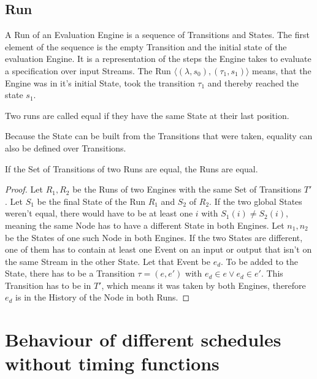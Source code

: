 \subsection{Run}
\label{sec:concepts:def:run}

A Run of an Evaluation Engine is a sequence of Transitions and States.
The first element of the sequence is the empty Transition and the initial state of the evaluation Engine.
It is a representation of the steps the Engine takes to evaluate a specification over input Streams.
The Run \(\langle (\lambda, s_0), (\tau_1, s_1) \rangle\) means, that the Engine was in it's initial State, took the transition \(\tau_1\) and thereby reached the state \(s_1\).

\begin{definition}
  Two runs are called equal if they have the same State at their last position.
\label{def:equal_runs}
\end{definition}

Because the State can be built from the Transitions that were taken, equality can also be defined over Transitions.

\begin{lemma}
If the Set of Transitions of two Runs are equal, the Runs are equal.
\label{lemma:equal_runs_with_transitions}
\end{lemma}
\begin{proof}
  Let \(R_1, R_2\) be the Runs of two Engines with the same Set of Transitions \(T'\).
  Let \(S_1\) be the final State of the Run \(R_1\) and \(S_2\) of \(R_2\).
  If the two global States weren't equal, there would have to be at least one \(i\) with \(S_1(i) \neq S_2(i)\), meaning the same Node has to have a different State in both Engines.
  Let \(n_1, n_2\) be the States of one such Node in both Engines.
  If the two States are different, one of them has to contain at least one Event on an input or output that isn't on the same Stream in the other State.
  Let that Event be \(e_d\).
  To be added to the State, there has to be a Transition \(\tau = (e, e')\) with \(e_d \in e \lor e_d \in e'\).
  This Transition has to be in \(T'\), which means it was taken by both Engines, therefore \(e_d\) is in the History of the Node in both Runs.
\end{proof}

\section{Behaviour of different schedules without timing functions}
\label{sec:concepts:behaviour_without_timing}

